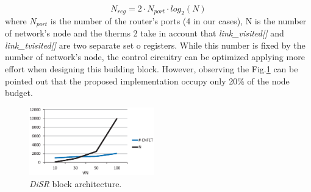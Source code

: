 \begin{equation}
  \label{eq:imp_trend}
  N_{reg}=2\cdot N_{port} \cdot log_2(N)
\end{equation}
where $N_{port}$ is the number of the router's ports (4 in our cases), N is the number 
of network's node and the therms 2 take in account that \emph{link\_visited[]} and 
\emph{link\_tvisited[]} are two separate set o registers. While this number is fixed by 
the number of network's node, the control circuitry can be optimized applying more effort 
when designing this building block. However, observing the Fig.\ref{fig:imp_trend} can 
be pointed out that the proposed implementation occupy only 20\% of the node budget. 

\begin{figure}
  \centering
  \includegraphics[width=0.48\textwidth]{pictures/imp.eps}
  \caption{\emph{DiSR} block architecture.}
 \label{fig:imp_trend}
\end{figure}